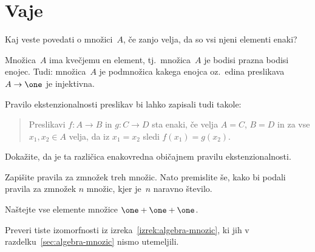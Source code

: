 \section{Vaje}

\begin{vaja}
Kaj veste povedati o množici~$A$, če zanjo velja, da so vsi njeni elementi enaki?
\begin{resitev}
Množica~$A$ ima kvečjemu en element, tj.~množica~$A$ je bodisi prazna bodisi enojec. Tudi: množica~$A$ je podmnožica kakega enojca oz.~edina preslikava $A \to \one$ je injektivna.
\end{resitev}
\end{vaja}

\begin{vaja}
  Pravilo ekstenzionalnosti preslikav bi lahko zapisali tudi takole:
  \begin{quote}
    Preslikavi $f : A \to B$ in $g : C \to D$ sta enaki, če velja $A = C$, $B = D$ in za
    vse $x_1, x_2 \in A$ velja, da iz $x_1 = x_2$ sledi $f(x_1) = g(x_2)$.
  \end{quote}
  Dokažite, da je ta različica enakovredna običajnem pravilu ekstenzionalnosti.
\end{vaja}

\begin{vaja}
  Zapišite pravila za zmnožek treh množic. Nato premislite še, kako bi podali pravila za
  zmnožek $n$ množic, kjer je~$n$ naravno število.
\end{vaja}

\begin{vaja}
  Naštejte vse elemente množice $\one + \one + \one$.
\end{vaja}

\begin{vaja}
  Preveri tiste izomorfnosti iz izreka~\ref{izrek:algebra-mnozic}, ki jih v
  razdelku~\ref{sec:algebra-mnozic} nismo utemeljili.
\end{vaja}
